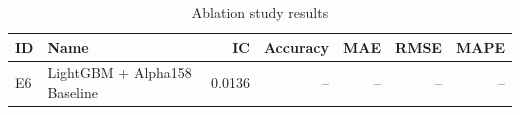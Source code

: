 \begin{table}[ht]
  \centering
  \caption{Ablation study results}
  \label{tab:ablation}
  \begin{tabular}{llrrrrr}
    \toprule
    \textbf{ID} & \textbf{Name} & \textbf{IC} & \textbf{Accuracy} & \textbf{MAE} & \textbf{RMSE} & \textbf{MAPE} \\
    \midrule
    E6 & LightGBM + Alpha158 Baseline & 0.0136 & -- & -- & -- & -- \\
    \bottomrule
  \end{tabular}
\end{table}

